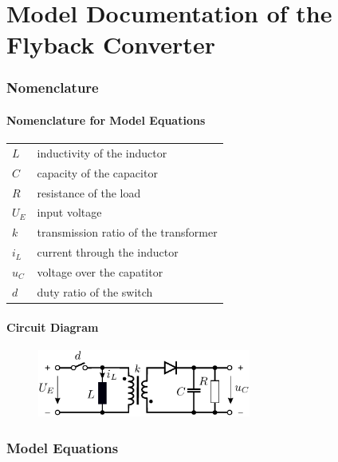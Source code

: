 \documentclass[10pt,a4paper]{article}
\begin{document}
	\part*{Model Documentation of the \\ Flyback Converter} %
	
	
	\section{Nomenclature} %
	\subsection{Nomenclature for Model Equations} %
	
	\begin{tabular}{ll}
		$L$ & inductivity of the inductor \\
		$C$ & capacity of the capacitor \\
		$R$ & resistance of the load \\
		$U_E$ & input voltage \\
		$k$ & transmission ratio of the transformer \\
		$i_L$ & current through the inductor \\
		$u_C$ & voltage over the capatitor \\
		$d$ & duty ratio of the switch \\

		
				
	\end{tabular}
	 
	\subsection{Circuit Diagram}
	\begin{figure}[H]
		\includegraphics[width=70mm]{Flyback_converter_circuit.pdf}
	\end{figure}
	
	
	\section{Model Equations} %
	
\end{document}
